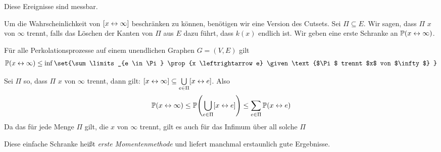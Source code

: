 \begin{uebung}
	Diese Ereignisse sind messbar.
\end{uebung}
Um die Wahrscheinlichkeit von $\left\lbrack x \leftrightarrow \infty\right\rbrack$ beschränken zu können, benötigen wir eine Version des Cutsets. Sei $\Pi \subseteq E$. Wir sagen, dass $\Pi$ $x$ von $\infty$ trennt, falls das Löschen der Kanten von $\Pi$ aus $E$ dazu führt, dass $k(x)$ endlich ist. Wir geben eine erste Schranke an $\propE{x \leftrightarrow \infty}$.
\begin{satz}
	\label{satz:6-3}
	Für alle Perkolationsprozesse auf einem unendlichen Graphen $G = (V,E)$ gilt
	\begin{align}
		\propE{x \leftrightarrow \infty} \leq \inf \set{\sum\limits_{e \in \Pi} \prop{x \leftrightarrow e} \given \text{$\Pi$ trennt $x$ von $\infty$} }
	\end{align}
\end{satz}
\begin{beweis}
	Sei $\Pi$ so, dass $\Pi$ $x$ von $ \infty$ trennt, dann gilt: $\benb{x \leftrightarrow \infty} \subseteq \bigcup\limits_{e \in \Pi} \benb{x \leftrightarrow e}$. Also
	\begin{align}
		\propE{x \leftrightarrow \infty} \leq \propE{\bigcup\limits_{e \in \Pi}\benb{x \leftrightarrow e}} \leq \sum\limits_{e \in \Pi}\propE{x \leftrightarrow e}
	\end{align}
	Da das für jede Menge $\Pi$ gilt, die $x$ von $\infty$ trennt, gilt es auch für das Infimum über all solche $\Pi$
\end{beweis}
Diese einfache Schranke heißt \emph{erste Momentenmethode} und liefert manchmal erstaunlich gute Ergebnisse.

